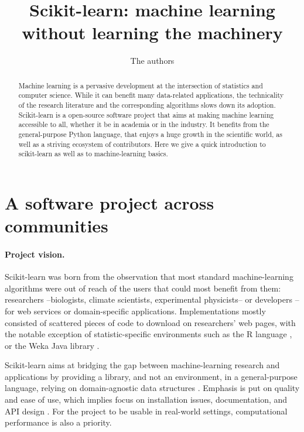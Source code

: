 \documentclass[a4paper]{article}
\title{Scikit-learn: machine learning without learning the machinery}
\author{The authors}
\begin{document}
\lstset{language=Python}

\maketitle

\begin{abstract}
Machine learning is a pervasive development at the intersection of
statistics and computer science. While it can benefit many
data-related applications, the technicality of the research literature
and the corresponding algorithms slows down its adoption. Scikit-learn is
a open-source software project that aims at making machine learning
accessible to all, whether it be in academia or in the industry. It
benefits from
the general-purpose Python language, that enjoys a huge growth in
the scientific world, as well as a striving ecosystem of contributors.
Here we give a quick introduction to scikit-learn as well as to
machine-learning basics.
\end{abstract}

\section{A software project across communities}

\paragraph{Project vision.}
%
Scikit-learn was born from the observation that most standard
machine-learning algorithms were out of reach of the users that could
most benefit from them: researchers --biologists, climate
scientists, experimental physicists-- or developers --for web
services or domain-specific applications.
%
Implementations mostly consisted of scattered pieces of code to download
on researchers' web pages, with the notable exception of
statistic-specific environments such as the R language \cite{Rmanual}, or
the Weka Java library \cite{hall2009weka}.

Scikit-learn aims at bridging the gap between machine-learning research and
applications by providing a library, and not an environment, in a
general-purpose language, relying on domain-agnostic data structures
\cite{pedregosa2011}. Emphasis is put on quality and ease of use, which
implies focus on installation issues, documentation, and API design
\cite{buitinck2013ecml}. For the project to be usable in real-world
settings, computational performance is also a priority.
\end{document}
